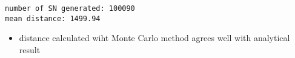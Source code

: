 \documentclass{article}
\newlength{\cellleftmargin}
\newlength{\smallerfontscale}
\def\smaller{\fontsize{\smallerfontscale}{\smallerfontscale}\selectfont}
\begin{document}
\par\vspace{1\smallerfontscale}%
    \begin{addmargin}[\cellleftmargin]{0em}%
    {\smaller%
    \vspace{-1\smallerfontscale}%
    
    \begin{Verbatim}[commandchars=\\\{\}]
number of SN generated: 100090
mean distance: 1499.94
    \end{Verbatim}
}%
    \end{addmargin}%
    \begin{itemize}
\itemsep1pt\parskip0pt
\item
  distance calculated wiht Monte Carlo method agrees well with
  analytical result
\end{itemize}

\end{document}
